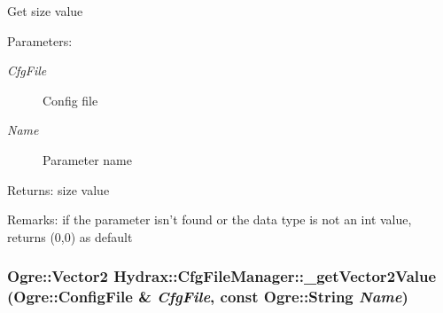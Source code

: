 Get size value \begin{Desc}
\item[Parameters:]
\begin{description}
\item[{\em CfgFile}]Config file \item[{\em Name}]Parameter name \end{description}
\end{Desc}
\begin{Desc}
\item[Returns:]size value \end{Desc}
\begin{Desc}
\item[Remarks:]if the parameter isn't found or the data type is not an int value, returns (0,0) as default \end{Desc}
\hypertarget{class_hydrax_1_1_cfg_file_manager_b29b2f7baca55593751de31f570fbfa9}{
\subsubsection[{\_\-getVector2Value}]{\setlength{\rightskip}{0pt plus 5cm}Ogre::Vector2 Hydrax::CfgFileManager::\_\-getVector2Value (Ogre::ConfigFile \& {\em CfgFile}, \/  const Ogre::String {\em Name})}}
\label{class_hydrax_1_1_cfg_file_manager_b29b2f7baca55593751de31f570fbfa9}


